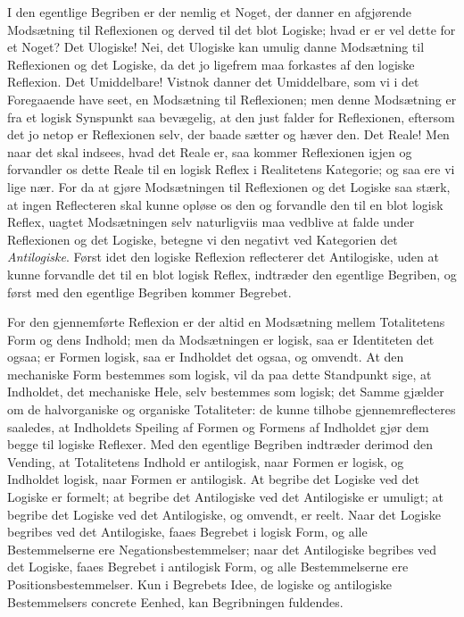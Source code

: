 \documentclass[12pt]{book}
\newcommand{\opage}[1]{\marginnote{\footnotesize\textit{[#1]}}}
\begin{document}
I den egentlige Begriben er der nemlig et Noget, der danner en afgjørende Modsætning til
\opage{145} Reflexionen og derved til det blot Logiske; hvad er er vel dette for et Noget? Det Ulogiske!
Nei, det Ulogiske kan umulig danne Modsætning til Reflexionen og det Logiske, da det jo
ligefrem maa forkastes af den logiske Reflexion. Det Umiddelbare! Vistnok danner det
Umiddelbare, som vi i det Foregaaende have seet, en Modsætning til Reflexionen; men denne
Modsætning er fra et logisk Synspunkt saa bevægelig, at den just falder for Reflexionen,
eftersom det jo netop er Reflexionen selv, der baade sætter og hæver den. Det Reale! Men naar
det skal indsees, hvad det Reale er, saa kommer Reflexionen igjen og forvandler os dette
Reale til en logisk Reflex i Realitetens Kategorie; og saa ere vi lige nær. For da at gjøre
Modsætningen til Reflexionen og det Logiske saa stærk, at ingen Reflecteren skal kunne opløse
os den og forvandle den til en blot logisk Reflex, uagtet Modsætningen selv naturligviis maa
vedblive at falde under Reflexionen og det Logiske, betegne vi den negativt ved Kategorien
det \emph{Antilogiske}. Først idet den logiske Reflexion reflecterer det Antilogiske, uden at
kunne forvandle det til en blot logisk Reflex, indtræder den egentlige Begriben, og først med
den egentlige Begriben kommer Begrebet.

For den gjennemførte Reflexion er der altid en Modsætning mellem Totalitetens Form og dens
Indhold; men da Modsætningen er logisk, saa er Identiteten det ogsaa; er Formen logisk, saa
er Indholdet det ogsaa, og omvendt. At den mechaniske Form bestemmes som logisk, vil da paa
dette Standpunkt sige, at Indholdet, det mechaniske Hele, selv bestemmes som logisk; det
Samme gjælder om de halvorganiske og organiske Totaliteter: de kunne tilhobe
gjennemreflecteres saaledes, at Indholdets Speiling af Formen og Formens af Indholdet gjør dem
begge til logiske Reflexer. Med den egentlige Begriben indtræder derimod den Vending, at
Totalitetens Indhold er antilogisk, naar Formen er logisk, og Indholdet logisk, naar Formen
er antilogisk. At begribe det Logiske ved det Logiske er formelt; at begribe det
\opage{146} Antilogiske ved det Antilogiske er umuligt; at begribe det Logiske ved det Antilogiske, og
omvendt, er reelt. Naar det Logiske begribes ved det Antilogiske, faaes Begrebet i logisk
Form, og alle Bestemmelserne ere Negationsbestemmelser; naar det Antilogiske begribes ved det
Logiske, faaes Begrebet i antilogisk Form, og alle Bestemmelserne ere Positionsbestemmelser.
Kun i Begrebets Idee, de logiske og antilogiske Bestemmelsers concrete Eenhed, kan
Begribningen fuldendes.
\end{document}
